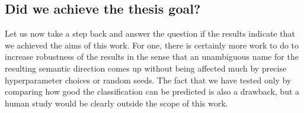 








\vspace{-1ex}
\subsection{Did we achieve the thesis goal?}

Let us now take a step back and answer the question if the results indicate that we achieved the aims of this work. For one, there is certainly more work to do to increase robustness of the results in the sense that an unambiguous name for the resulting semantic direction comes up without being affected much by precise hyperparameter choices or random seeds. The fact that we have tested only by comparing how good the classification can be predicted is also a drawback, but a human study would be clearly outside the scope of this work.

